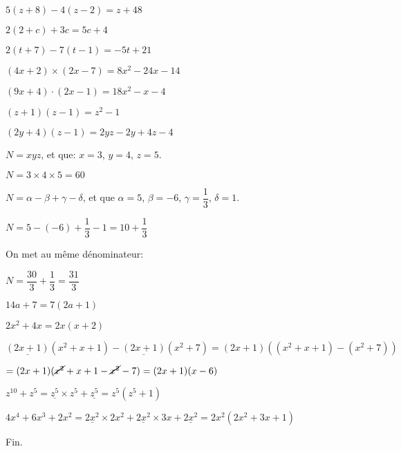 \documentclass[a4paper,12pt]{scrartcl}
\begin{document}
\question{}
$5(z+8)-4(z-2) = z + 48$

\question{}
$2(2+c)+3c = 5c + 4$

\question{}
$2(t + 7)-7(t - 1) = -5t + 21$


\question{}
$(4x+2) \times (2x-7) = 8x^2-24x-14$

\question{}
$(9x+4) \cdot (2x-1) = 18x^2-x-4$

\question{}
$(z+1)(z-1) = z^2-1$

\question{}
$(2y+4)(z-1) = 2yz-2y+4z-4$


\question{}
$N = xyz$, et que: $x=3$, $y=4$, $z=5$.

$N = 3 \times 4 \times 5 = 60$

\question{}
$N = \alpha - \beta + \gamma - \delta$, et que $\alpha = 5$, $\beta = -6$, $\gamma = \dfrac{1}{3}$, $\delta = 1$.

$N = 5 - (-6) + \dfrac{1}{3} - 1 = 10 + \dfrac{1}{3}$

On met au même dénominateur: 

$N = \dfrac{30}{3} + \dfrac{1}{3} = \dfrac{31}{3}$


\question{}
$14a + 7 = 7(2a + 1)$

\question{}
$2x^2 + 4x = 2x(x+2)$

\question{}
$\underline{(2x+1)}(x^2 + x + 1) - \underline{(2x+1)}(x^2 + 7) = (2x+1)((x^2 + x + 1) - (x^2 + 7))$

$= (2x+1)(\cancel{x^2} + x + 1 - \cancel{x^2} - 7) = (2x+1)(x-6)$

\question{}
$z^{10} + z^5 = \underline{z^5} \times z^5 + \underline{z^5} = z^5(z^5 + 1)$

\question{}
$4x^4 + 6x^3 + 2x^2 = \underline{2x^{2}} \times 2x^{2} + \underline{2x^{2}} \times 3x + \underline{2x^{2}} = 2x^{2}(2x^{2} + 3x + 1)$

\trait

\begin{center}
Fin.
\end{center}
\end{document}
